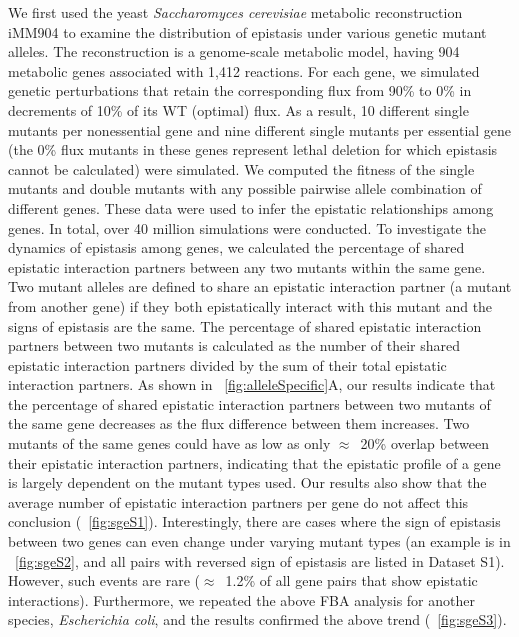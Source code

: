 We first used the yeast \textit{Saccharomyces cerevisiae} metabolic
reconstruction iMM904 \citep{Mo2009} to examine the distribution of epistasis
under various genetic mutant alleles. The reconstruction is a
genome-scale metabolic model, having 904 metabolic genes associated
with 1,412 reactions. For each gene, we simulated genetic
perturbations that retain the corresponding flux from 90\% to 0\% in
decrements of 10\% of its WT (optimal) flux. As a result, 10 different
single mutants per nonessential gene and nine different single mutants
per essential gene (the 0\% flux mutants in these genes represent
lethal deletion for which epistasis cannot be calculated) were
simulated. We computed the fitness of the single mutants and double
mutants with any possible pairwise allele combination of different
genes. These data were used to infer the epistatic relationships among
genes. In total, over 40 million simulations were conducted.  To
investigate the dynamics of epistasis among genes, we calculated the
percentage of shared epistatic interaction partners between any two
mutants within the same gene. Two mutant alleles are defined to share
an epistatic interaction partner (a mutant from another gene) if they
both epistatically interact with this mutant and the signs of
epistasis are the same. The percentage of shared epistatic interaction
partners between two mutants is calculated as the number of their
shared epistatic interaction partners divided by the sum of their
total epistatic interaction partners. As shown in
\Fig~\ref{fig:alleleSpecific}A, our results
indicate that the percentage of shared epistatic interaction partners
between two mutants of the same gene decreases as the flux difference
between them increases. Two mutants of the same genes could have as
low as only $\approx$~20\% overlap between their epistatic interaction
partners, indicating that the epistatic profile of a gene is largely
dependent on the mutant types used. Our results also show that the
average number of epistatic interaction partners per gene do not
affect this conclusion (\Fig~\ref{fig:sgeS1}). Interestingly, there are cases where
the sign of epistasis between two genes can even change under varying
mutant types (an example is in \Fig~\ref{fig:sgeS2}, and all pairs with reversed
sign of epistasis are listed in Dataset S1). However, such events are
rare ($\approx$~1.2\% of all gene pairs that show epistatic
interactions). Furthermore, we repeated the above FBA analysis for
another species, \textit{Escherichia coli}, and the results confirmed
the above trend (\Fig~\ref{fig:sgeS3}).

